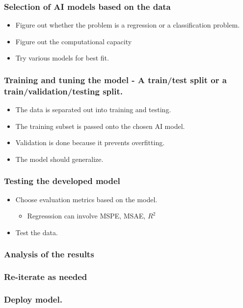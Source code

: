 \documentclass[11pt]{article}
\begin{document}
\subsubsection{Selection of AI models based on the data}
\label{sec:org716de50}
\begin{itemize}
\item Figure out whether the problem is a regression or a classification problem.
\item Figure out the computational capacity
\item Try various models for best fit.
\end{itemize}
\subsubsection{Training and tuning the model - A train/test split or a train/validation/testing split.}
\label{sec:org799658f}
\begin{itemize}
\item The data is separated out into training and testing.
\item The training subset is passed onto the chosen AI model.
\item Validation is done because it prevents overfitting.
\item The model should generalize.
\end{itemize}
\subsubsection{Testing the developed model}
\label{sec:orgb3cd545}
\begin{itemize}
\item Choose evaluation metrics based on the model.
\begin{itemize}
\item Regresssion can involve MSPE, MSAE, \(R^2\)
\end{itemize}
\item Test the data.
\end{itemize}
\subsubsection{Analysis of the results}
\label{sec:org6117b8d}
\subsubsection{Re-iterate as needed}
\label{sec:org3ff2c10}
\subsubsection{Deploy model.}
\label{sec:org78e1c7f}
\end{document}
